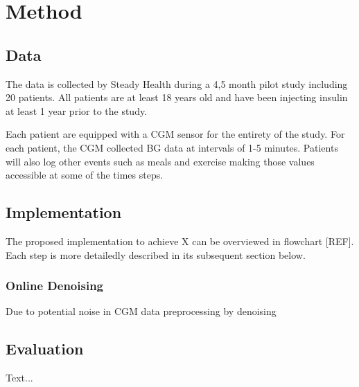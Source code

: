 \chapter{Method}

\section{Data}

The data is collected by Steady Health during a 4,5 month pilot study including 20 patients.
All patients are at least 18 years old and have been injecting insulin at least 1 year prior to the study.

Each patient are equipped with a CGM sensor for the entirety of the study.
For each patient, the CGM collected BG data at intervals of 1-5 minutes.
Patients will also log other events such as meals and exercise making those values accessible at some of the times steps.



\section{Implementation}

The proposed implementation to achieve X can be overviewed in flowchart [REF].
Each step is more detailedly described in its subsequent section below.

\subsection{Online Denoising}

Due to potential noise in CGM data preprocessing by denoising

\section{Evaluation}
Text...
